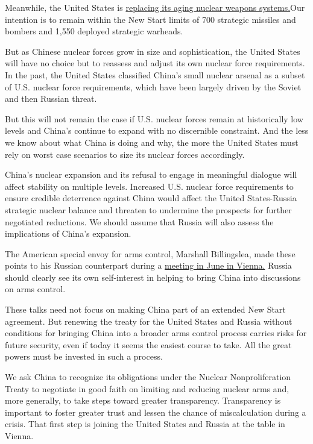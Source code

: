 Meanwhile, the United States is
\href{https://www.armscontrol.org/factsheets/USNuclearModernization}{replacing
its aging nuclear weapons systems.}Our intention is to remain within the
New Start limits of 700 strategic missiles and bombers and 1,550
deployed strategic warheads.

But as Chinese nuclear forces grow in size and sophistication, the
United States will have no choice but to reassess and adjust its own
nuclear force requirements. In the past, the United States classified
China's small nuclear arsenal as a subset of U.S. nuclear force
requirements, which have been largely driven by the Soviet and then
Russian threat.

But this will not remain the case if U.S. nuclear forces remain at
historically low levels and China's continue to expand with no
discernible constraint. And the less we know about what China is doing
and why, the more the United States must rely on worst case scenarios to
size its nuclear forces accordingly.

China's nuclear expansion and its refusal to engage in meaningful
dialogue will affect stability on multiple levels. Increased U.S.
nuclear force requirements to ensure credible deterrence against China
would affect the United States-Russia strategic nuclear balance and
threaten to undermine the prospects for further negotiated reductions.
We should assume that Russia will also assess the implications of
China's expansion.

The American special envoy for arms control, Marshall Billingslea, made
these points to his Russian counterpart during a
\href{https://www.state.gov/special-presidential-envoy-ambassador-marshall-billingslea-travels-to-austria/}{meeting
in June in Vienna.} Russia should clearly see its own self-interest in
helping to bring China into discussions on arms control.

These talks need not focus on making China part of an extended New Start
agreement. But renewing the treaty for the United States and Russia
without conditions for bringing China into a broader arms control
process carries risks for future security, even if today it seems the
easiest course to take. All the great powers must be invested in such a
process.

We ask China to recognize its obligations under the Nuclear
Nonproliferation Treaty to negotiate in good faith on limiting and
reducing nuclear arms and, more generally, to take steps toward greater
transparency. Transparency is important to foster greater trust and
lessen the chance of miscalculation during a crisis. That first step is
joining the United States and Russia at the table in Vienna.

